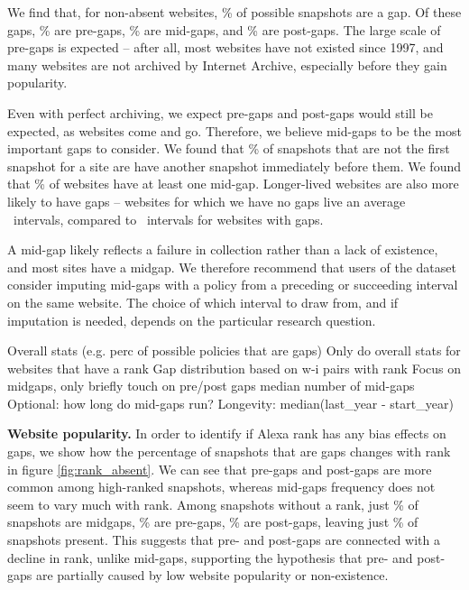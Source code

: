 We find that, for non-absent websites, \gapsPerc\% of possible snapshots are a gap. Of these gaps, \pregapsPerc\% are pre-gaps, \midgapsPerc\% are mid-gaps, and \postgapsPerc\% are post-gaps. The large scale of pre-gaps is expected -- after all, most websites have not existed since 1997, and many websites are not archived by Internet Archive, especially before they gain popularity.

Even with perfect archiving, we expect pre-gaps and post-gaps would still be expected, as websites come and go. Therefore, we believe mid-gaps to be the most important gaps to consider. We found that \percSnapshotWithPrior\% of snapshots that are not the first snapshot for a site are have another snapshot immediately before them. We found that \midgapsDomainsPerc\% of websites have at least one mid-gap. Longer-lived websites are also more likely to have gaps -- websites for which we have no gaps live an average \lifespanNoGaps~intervals, compared to \lifespanGaps~intervals for websites with gaps.

A mid-gap likely reflects a failure in collection rather than a lack of existence, and most sites have a midgap. We therefore recommend that users of the dataset consider imputing mid-gaps with a policy from a preceding or succeeding interval on the same website. The choice of which interval to draw from, and if imputation is needed, depends on the particular research question.

Overall stats (e.g. perc of possible policies that are gaps)
Only do overall stats for websites that have a rank
Gap distribution based on w-i pairs with rank
Focus on midgaps, only briefly touch on pre/post gaps
median number of mid-gaps
Optional: how long do mid-gaps run?
Longevity: median(last\_year - start\_year)


{\textbf{Website popularity.}}
In order to identify if Alexa rank has any bias effects on gaps, we show how the percentage of snapshots that are gaps changes with rank in figure \ref{fig:rank_absent}. We can see that pre-gaps and post-gaps are more common among high-ranked snapshots, whereas mid-gaps frequency does not seem to vary much with rank. Among snapshots without a rank, just \midgapNoRankPerc\% of snapshots are midgaps, \pregapNoRankPerc\% are pre-gaps, \postgapNoRankPerc\%  are post-gaps, leaving just \notgapNoRankPerc\% of snapshots present. This suggests that pre- and post-gaps are connected with a decline in rank, unlike mid-gaps, supporting the hypothesis that pre- and post-gaps are partially caused by low website popularity or non-existence.

